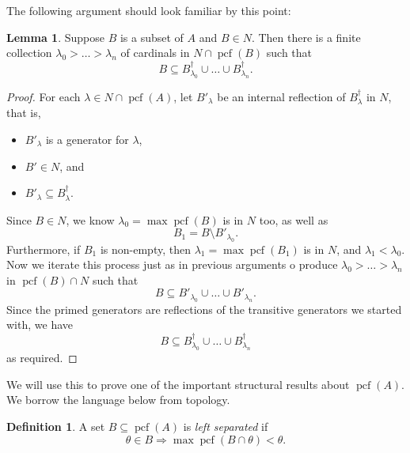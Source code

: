 \documentclass[10pt]{amsart}
\theoremstyle{plain}
\theoremstyle{definition}
\newtheorem{lemma}[proposition]{Lemma}
\newtheorem{definition}[proposition]{Definition}
\theoremstyle{remark}
\DeclareMathOperator{\pcf}{pcf}
\numberwithin{equation}{section}
\begin{document}
The following argument should look familiar by this point:
\begin{lemma}
\label{lem:ComForTrans}
Suppose $B$ is a subset of $A$ and $B\in N$.  Then there is a finite collection $\lambda_0>\dots>\lambda_n$ of cardinals in $N\cap\pcf(B)$
such that
\begin{equation}
B\subseteq B^\dagger_{\lambda_0}\cup\dots\cup B^\dagger_{\lambda_n}.
\end{equation}
\end{lemma}
\begin{proof}
For each $\lambda\in N\cap\pcf(A)$, let $B'_\lambda$ be an internal reflection of $B^\dagger_\lambda$ in $N$, that is,
\begin{itemize}
\item $B'_\lambda$ is a generator for $\lambda$,
\item $B'\in N$,  and
\item $B'_\lambda\subseteq B^\dagger_\lambda$.
\end{itemize}


Since $B\in N$, we know $\lambda_0 = \max\pcf(B)$ is in $N$ too, as well as
\begin{equation}
B_1 = B\setminus B'_{\lambda_0}.
\end{equation}
Furthermore, if $B_1$ is non-empty, then $\lambda_1=\max\pcf(B_1)$ is in $N$, and $\lambda_1<\lambda_0$.  Now we iterate this process
just as in previous arguments o produce $\lambda_0>\dots>\lambda_n$ in $\pcf(B)\cap N$ such that
\begin{equation}
B\subseteq B'_{\lambda_0}\cup\dots\cup B'_{\lambda_n}.
\end{equation}
Since the primed generators are reflections of the transitive generators we started with, we have
\begin{equation}
B\subseteq B^\dagger_{\lambda_0}\cup\dots\cup B^\dagger_{\lambda_n}
\end{equation}
as required.
\end{proof}

We will use this to prove one of the important structural results about $\pcf(A)$. We borrow the language below from topology.


\begin{definition}
A set $B\subseteq \pcf(A)$ is {\em left separated} if
\begin{equation}
\theta\in B\Longrightarrow \max\pcf(B\cap\theta)<\theta.
\end{equation}
\end{definition}
\end{document}
